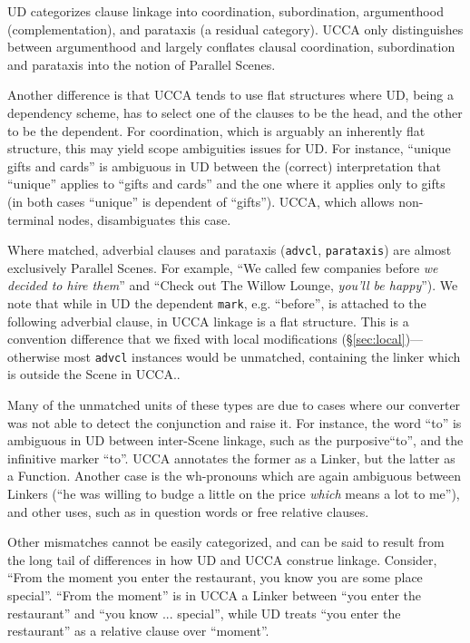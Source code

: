 \documentclass[11pt,a4paper]{article}
\newcommand{\daniel}[1]{\footnote{\color{blue}DH: #1}}
\begin{document}

UD categorizes clause linkage into coordination,
subordination, argumenthood (complementation),
and parataxis (a residual category).
UCCA only distinguishes between argumenthood 
and largely conflates clausal coordination, subordination and parataxis into the notion
of Parallel Scenes.

Another difference is that UCCA tends to use flat structures where UD, being a dependency scheme,
has to select one of the clauses to be the head, and the other to be the dependent. For coordination,
which is arguably an inherently flat structure, this may yield scope ambiguities issues for UD. 
For instance, ``unique gifts and cards'' is ambiguous in UD between the (correct) interpretation 
that ``unique'' applies to ``gifts and cards'' and the one where it applies only to gifts (in both
cases ``unique'' is dependent of ``gifts''). UCCA, which allows non-terminal nodes, disambiguates
this case.

Where matched, adverbial clauses and parataxis (\texttt{advcl}, \texttt{parataxis})
are almost exclusively Parallel Scenes.
For example, ``We called few companies before \textit{we decided to hire them}''
and ``Check out The Willow Lounge, \textit{you'll be happy}'').
We note that while in UD the dependent \texttt{mark}, e.g. ``before'',
is attached to the following adverbial clause,
in UCCA linkage is a flat structure.
This is a convention difference that we fixed with local modifications
(\S\ref{sec:local})---otherwise most \texttt{advcl} instances would be unmatched,
containing the linker which is outside the Scene in UCCA..

Many of the unmatched units of these types are due to cases where our converter was not able to detect the conjunction 
and raise it. 
For instance, the word ``to'' is ambiguous in UD between inter-Scene linkage, such as the purposive``to'', and
the infinitive marker ``to''. UCCA annotates the former as a Linker, but the latter as a Function.
Another case is the wh-pronouns which are again ambiguous between Linkers (``he was willing to budge a little on the price {\it which} means a lot to me''),
and other uses, such as in question words or free relative clauses.

Other mismatches cannot be easily categorized, and can be said to result from the long tail of differences in how UD and UCCA construe linkage.
Consider, ``From the moment you enter the restaurant, you know you are some place special''. ``From the moment'' is in UCCA
a Linker between ``you enter the restaurant'' and ``you know ... special'', while UD treats ``you enter the restaurant'' as a relative
clause over ``moment''.
\end{document}
